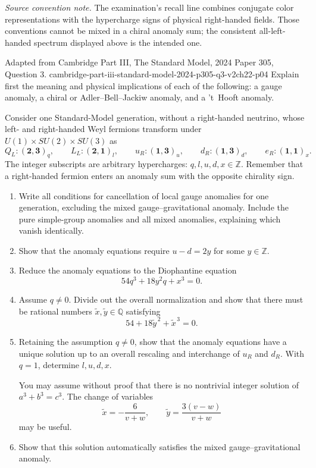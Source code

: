 \begin{enumerate}
  \emph{Source convention note.}  The examination's recall line combines
  conjugate color representations with the hypercharge signs of physical
  right-handed fields.  Those conventions cannot be mixed in a chiral
  anomaly sum; the consistent all-left-handed spectrum displayed above is
  the intended one.

  {Adapted from Cambridge Part III, The Standard Model, 2024 Paper 305,
  Question 3.}
  {cambridge-part-iii-standard-model-2024-p305-q3-v2ch22-p04}
  Explain first the meaning and physical implications of each of the
  following: a gauge anomaly, a chiral or Adler--Bell--Jackiw anomaly, and
  a 't~Hooft anomaly.

  Consider one Standard-Model generation, without a right-handed neutrino,
  whose left- and right-handed Weyl fermions transform under
  \(U(1)\times SU(2)\times SU(3)\) as
  \[
    Q_L:(\mathbf2,\mathbf3)_q,\qquad
    L_L:(\mathbf2,\mathbf1)_l,\qquad
    u_R:(\mathbf1,\mathbf3)_u,\qquad
    d_R:(\mathbf1,\mathbf3)_d,\qquad
    e_R:(\mathbf1,\mathbf1)_x.
  \]
  The integer subscripts are arbitrary hypercharges:
  \(q,l,u,d,x\in\mathbb Z\).  Remember that a right-handed fermion enters
  an anomaly sum with the opposite chirality sign.
  \begin{enumerate}
    \item[(i)]
    Write all conditions for cancellation of local gauge anomalies for one
    generation, excluding the mixed gauge--gravitational anomaly.  Include
    the pure simple-group anomalies and all mixed anomalies, explaining
    which vanish identically.
    \item[(ii)]
    Show that the anomaly equations require
    \(u-d=2y\) for some \(y\in\mathbb Z\).
    \item[(iii)]
    Reduce the anomaly equations to the Diophantine equation
    \[
      54q^3+18y^2q+x^3=0.
    \]
    \item[(iv)]
    Assume \(q\ne0\).  Divide out the overall normalization and show that
    there must be rational numbers \(\widetilde x,\widetilde y\in\mathbb Q\)
    satisfying
    \[
      54+18\widetilde y^{\,2}+\widetilde x^{\,3}=0.
    \]
    \item[(v)]
    Retaining the assumption \(q\ne0\), show that the anomaly equations
    have a unique solution up to an overall rescaling and interchange of
    \(u_R\) and \(d_R\).  With \(q=1\), determine \(l,u,d,x\).

    You may assume without proof that there is no nontrivial integer
    solution of \(a^3+b^3=c^3\).  The change of variables
    \[
      \widetilde x=-\frac{6}{v+w},
      \qquad
      \widetilde y=\frac{3(v-w)}{v+w}
    \]
    may be useful.
    \item[(vi)]
    Show that this solution automatically satisfies the mixed
    gauge--gravitational anomaly.
  \end{enumerate}


\end{enumerate}

